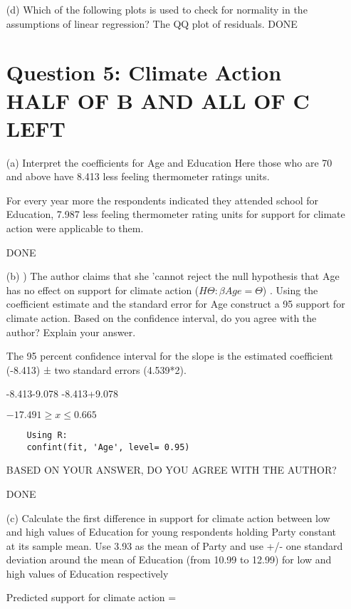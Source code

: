 \documentclass[12pt,letterpaper]{article}
\begin{document}
\begin{enumerate}
\item [(d)] Which of the following plots is used to check for normality in the assumptions of linear
regression?
The QQ plot of residuals.
DONE
 
	\vspace{.5cm}
	\newpage
\section*{Question 5: Climate Action HALF OF B AND ALL OF C LEFT}
\item [(a)]  Interpret the coefficients for Age and Education
Here those who are 70 and above have 8.413 less feeling thermometer ratings units. 

For every year more the respondents indicated they attended school for Education, 7.987 less feeling thermometer rating units for support for climate action were applicable to them. 

DONE

\item [(b)] ) The author claims that she ’cannot reject the null hypothesis that Age has no effect on support for climate action 
($H\Theta : \beta Age = \Theta$) .
 Using the coefficient estimate and the
standard error for Age construct a 95%
support for climate action. Based on the confidence interval, do you agree with the
author? Explain your answer.


	The 95
	percent confidence interval for the slope is the estimated coefficient (-8.413) ± two standard errors (4.539*2).
	
	-8.413-9.078
	-8.413+9.078
	
	$-17.491 \ge x \le 0.665$
	
	
	\begin{verbatim}
	Using R: 
	confint(fit, 'Age', level= 0.95)
\end{verbatim}

BASED ON YOUR ANSWER, DO YOU AGREE WITH THE AUTHOR?

DONE

\item [(c)] Calculate the first difference in support for climate action between low and high values
of Education for young respondents holding Party constant at its sample mean. Use
3.93 as the mean of Party and use +/- one standard deviation around the mean of
Education (from 10.99 to 12.99) for low and high values of Education respectively


Predicted support for climate action =  
\begin{verbatim}
	

\end{verbatim}
\end{enumerate}
\end{document}

